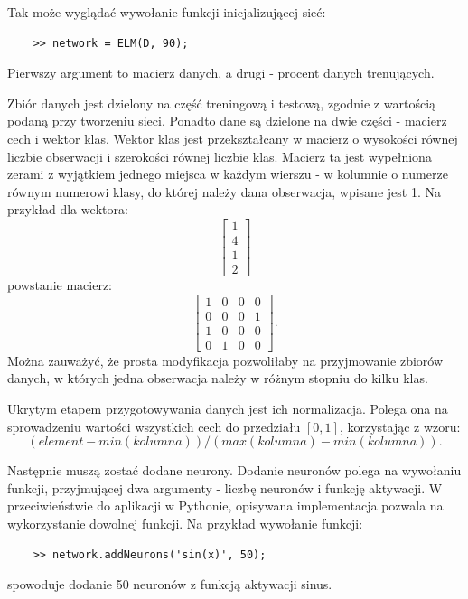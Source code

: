 \documentclass{article}
\begin{document}
Tak może wyglądać wywołanie funkcji inicjalizującej sieć:
\begin{lstlisting}
	>> network = ELM(D, 90);
\end{lstlisting}
Pierwszy argument to macierz danych, a drugi - procent danych trenujących.

Zbiór danych jest dzielony na część treningową i testową, zgodnie z wartością podaną przy tworzeniu sieci. 
Ponadto dane są dzielone na dwie części - macierz cech i wektor klas.
Wektor klas jest przekształcany w macierz o wysokości równej liczbie obserwacji i szerokości równej liczbie klas.
Macierz ta jest wypełniona zerami z wyjątkiem jednego miejsca w każdym wierszu - w kolumnie o numerze równym numerowi klasy, do której należy dana obserwacja, wpisane jest 1.
Na przykład dla wektora:
\[ \begin{bmatrix} 1 \\ 4 \\ 1 \\ 2 \end{bmatrix}\]
powstanie macierz:
\[ \begin{bmatrix} 1&0&0&0 \\ 0&0&0&1 \\ 1&0&0&0 \\ 0&1&0&0 \end{bmatrix}.\]
Można zauważyć, że prosta modyfikacja pozwoliłaby na przyjmowanie zbiorów danych, w których jedna obserwacja należy w różnym stopniu do kilku klas.

Ukrytym etapem przygotowywania danych jest ich normalizacja. 
Polega ona na sprowadzeniu wartości wszystkich cech do przedziału $[0, 1]$, korzystając z wzoru:
\[(element - min(kolumna))/(max(kolumna) - min(kolumna)).\]

Następnie muszą zostać dodane neurony.
Dodanie neuronów polega na wywołaniu funkcji, przyjmującej dwa argumenty - liczbę neuronów i funkcję aktywacji.
W przeciwieństwie do aplikacji w Pythonie, opisywana implementacja pozwala na wykorzystanie dowolnej funkcji.
Na przykład wywołanie funkcji:
\begin{lstlisting}
	>> network.addNeurons('sin(x)', 50);
\end{lstlisting}
spowoduje dodanie 50 neuronów z funkcją aktywacji sinus.
\end{document}
